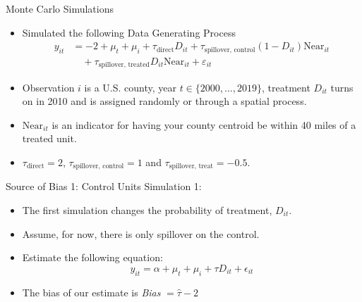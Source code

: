 \documentclass[aspectratio=169]{beamer}
\begin{document}
\begin{frame}{Monte Carlo Simulations}
    \begin{itemize}
        \item Simulated the following Data Generating Process \begin{align*}
            y_{it} &= -2 + \mu_t + \mu_i + \tau_{\text{direct}} D_{it} + \tau_{\text{spillover, control}} (1-D_{it}) \text{Near}_{it} \\ 
            &\quad + \tau_{\text{spillover, treated}} D_{it} \text{Near}_{it} + \varepsilon_{it}
        \end{align*}

        \item Observation $i$ is a U.S. county, year $t \in \{2000, \dots, 2019\}$, treatment $D_{it}$ turns on in 2010 and is assigned randomly or through a spatial process.
        
        \item $\text{Near}_{it}$ is an indicator for having your county centroid be within 40 miles of a treated unit. 
        
        \item $\tau_{\text{direct}} = 2$, $\tau_{\text{spillover, control}} = 1$ and $\tau_{\text{spillover, treat}} = -0.5$.
    \end{itemize}
\end{frame}

\begin{frame}{Source of Bias 1: Control Units}
    Simulation 1: 
    
    \begin{itemize}
        \item The first simulation changes the probability of treatment, $D_{it}$.
        
        \item Assume, for now, there is only spillover on the control.
        
        \item Estimate the following equation: \[ 
            y_{it} = \alpha + \mu_t + \mu_i + \tau D_{it} + \epsilon_{it}    
        \]
        
        \item The bias of our estimate is \textit{Bias} $= \hat{\tau} - 2$
    \end{itemize}


    
\end{frame}

\end{document}
